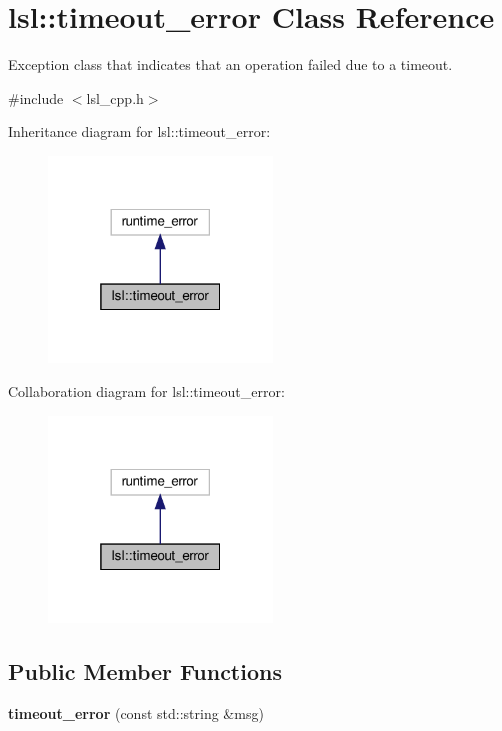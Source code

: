 \hypertarget{classlsl_1_1timeout__error}{}\section{lsl\+:\+:timeout\+\_\+error Class Reference}
\label{classlsl_1_1timeout__error}


Exception class that indicates that an operation failed due to a timeout.  




{\ttfamily \#include $<$lsl\+\_\+cpp.\+h$>$}



Inheritance diagram for lsl\+:\+:timeout\+\_\+error\+:\nopagebreak
\begin{figure}[H]
\begin{center}
\leavevmode
\includegraphics[width=169pt]{d9/d05/classlsl_1_1timeout__error__inherit__graph}
\end{center}
\end{figure}


Collaboration diagram for lsl\+:\+:timeout\+\_\+error\+:\nopagebreak
\begin{figure}[H]
\begin{center}
\leavevmode
\includegraphics[width=169pt]{d4/d2c/classlsl_1_1timeout__error__coll__graph}
\end{center}
\end{figure}
\subsection*{Public Member Functions}
\begin{DoxyCompactItemize}
\item 
\mbox{\label{classlsl_1_1timeout__error_afbc3b7c957fe3da4021aff3c30e6192f}} 
{\bfseries timeout\+\_\+error} (const std\+::string \&msg)
\end{DoxyCompactItemize}


